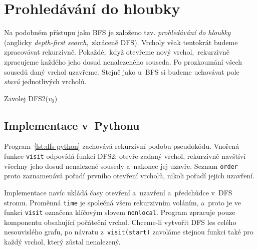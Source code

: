 \section{Prohledávání do hloubky}\label{sec:dfs}
Na podobném přístupu jako BFS je založeno tzv. \emph{prohledávání do hloubky} (anglicky \emph{depth-first search},~zkráceně DFS). Vrcholy však tentokrát budeme zpracovávat rekurzivně. Pokaždé,~když otevřeme nový vrchol,~rekurzivně zpracujeme každého jeho dosud nenalezeného souseda. Po prozkoumání všech sousedů daný vrchol uzavřeme. Stejně jako u~BFS si budeme uchovávat pole \emph{stavů} jednotlivých vrcholů.
\begin{algorithm}
    \caption{DFS (prohledávání do hloubky)}
    \label{alg:dfs}
    Zavolej DFS2($v_0$)\\
\end{algorithm}

\subsection{Implementace v~Pythonu}

Program~\ref{lst:dfs-python} zachovává rekurzivní podobu pseudokódu. Vnořená funkce \texttt{visit} odpovídá funkci \textsc{DFS2}: otevře zadaný vrchol, rekurzivně navštíví všechny jeho dosud nenalezené sousedy a~nakonec jej uzavře. Seznam \texttt{order} proto zaznamenává pořadí prvního otevření vrcholů, nikoli pořadí jejich uzavření.

Implementace navíc ukládá časy otevření a~uzavření a~předchůdce v~DFS stromu. Proměnná \texttt{time} je společná všem rekurzivním voláním, a~proto je ve funkci \texttt{visit} označena klíčovým slovem \texttt{nonlocal}. Program zpracuje pouze komponentu obsahující počáteční vrchol. Chceme-li vytvořit DFS les celého nesouvislého grafu, po návratu z~\texttt{visit(start)} zavoláme stejnou funkci také pro každý vrchol, který zůstal nenalezený.



